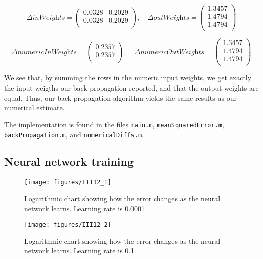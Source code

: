 \documentclass[a4paper, 11pt]{article}
\begin{document}
\begin{equation*}
  \Delta \textit{inWeights} =
  \begin{pmatrix}
    0.0328 & 0.2029 \\
    0.0328 & 0.2029 \\
  \end{pmatrix},
  \quad
  \Delta \textit{outWeights} =
  \begin{pmatrix}
    1.3457 \\
    1.4794 \\
    1.4794 \\
  \end{pmatrix}
\end{equation*}

\begin{equation*}
  \Delta \textit{numericInWeights} =
  \begin{pmatrix}
    0.2357 \\
    0.2357 \\
  \end{pmatrix},
  \quad
  \Delta \textit{numericOutWeights} =
  \begin{pmatrix}
    1.3457 \\
    1.4794 \\
    1.4794 \\
  \end{pmatrix}
\end{equation*}

We see that, by summing the rows in the numeric input weights, we get exactly the input weigths our back-propagation reported, and that the output weights are equal. Thus, our back-propagation algorithm yields the same results as our numerical estimate.

The implementation is found in the files \texttt{main.m}, \texttt{meanSquaredError.m},  \texttt{backPropagation.m}, and \texttt{numericalDiffs.m}.

\subsection{Neural network training}

\begin{figure}[H]
    \centering
    \texttt{[image: figures/III12\_1]}
    \caption{Logarithmic chart showing how the error changes as the neural network learns. Learning rate is 0.0001}
    \label{fig:III12_1}
\end{figure}

\begin{figure}[H]
    \centering
    \texttt{[image: figures/III12\_2]}
    \caption{Logarithmic chart showing how the error changes as the neural network learns. Learning rate is 0.1}
    \label{fig:III12_2}
\end{figure}
\end{document}
